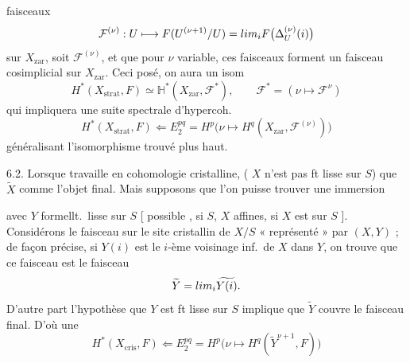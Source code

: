 \documentclass[11pt,a4paper]{article}
\begin{document}

faisceaux
\[
  \mathcal{F}^{(\nu)} : U \longmapsto F(U^{(\nu+1)}/U)
  = \varprojlim_{i} F\bigl(\Delta^{(\nu)}_{U}(i)\bigr)
\]
sur $X_{\mathrm{zar}}$, soit $\mathcal{F}^{(\nu)}$, et que pour $\nu$
variable, ces faisceaux forment un faisceau cosimplicial sur
$X_{\mathrm{zar}}$. Ceci posé, on aura un isom
\[
  H^{*}(X_{\mathrm{strat}}, F) \simeq
  \mathbb{H}^{*}(X_{\mathrm{zar}}, \mathcal{F}^{*}) ,
  \qquad
  \mathcal{F}^{*} = (\nu \mapsto \mathcal{F}^{\nu})
\]
qui impliquera une suite spectrale d'hypercoh.
\[
  \boxed{\;H^{*}(X_{\mathrm{strat}}, F) \Longleftarrow
  E_{2}^{pq} = H^{p}\bigl(\nu \mapsto H^{q}(X_{\mathrm{zar}},
  \mathcal{F}^{(\nu)})\bigr)\;}
\]
généralisant l'isomorphisme trouvé plus haut.


6.2. Lorsque  travaille en cohomologie cristalline, \ill{}
\ill{}  ( $X$ n'est pas ft
lisse sur $S$) \ill{}  que $\widetilde{X}$ comme l'objet
final. Mais supposons que l'on puisse trouver une immersion



avec $Y$ formellt.\ lisse sur $S$ [ possible
, \ill{} si $S$, $X$ affines, \ill{} si $X$ est
 sur $S$ \struck{\ill{}}  \ill{}
\ill{} \ill{}]. Considérons le faisceau sur le site cristallin de $X/S$
« représenté » par $(X, Y)$ ; de façon précise, si $Y(i)$ est le $i$-ème
voisinage inf.\ de $X$ dans $Y$, on trouve que ce faisceau est le faisceau
\[
  \widetilde{Y} = \varinjlim_{i} \widetilde{Y(i)} .
\]
D'autre part l'hypothèse que $Y$ est ft lisse sur $S$
implique que $\widetilde{Y}$ couvre le faisceau final. D'où une
\[
  H^{*}(X_{\mathrm{cris}}, F) \Longleftarrow
  E_{2}^{pq} = H^{p}\bigl(\nu \mapsto H^{q}(\widetilde{Y}^{\nu+1}, F)\bigr)
\]
\end{document}
